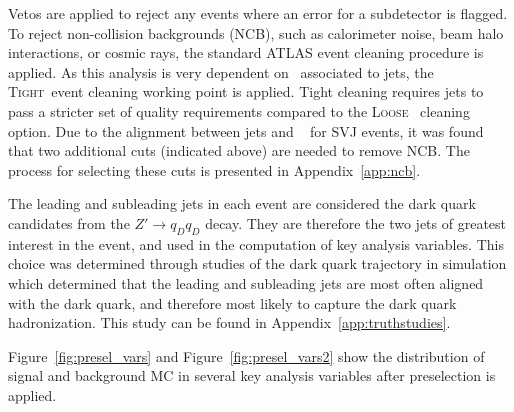 Vetos are applied to reject any events where an error for a subdetector is flagged. 
To reject non-collision backgrounds (NCB), such as calorimeter noise, beam halo interactions, or cosmic rays, the standard ATLAS event cleaning procedure is applied.
As this analysis is very dependent on \met~associated to jets, the \textsc{Tight}~\cite{tight_loose}event cleaning working point is applied. 
Tight cleaning requires jets to pass a stricter set of quality requirements compared to the \textsc{Loose}~\cite{tight_loose} cleaning option.
Due to the alignment between jets and \met~ for SVJ events, it was found that two additional cuts (indicated above) are needed to remove NCB.
The process for selecting these cuts is presented in Appendix~\ref{app:ncb}. 

The leading and subleading jets in each event are considered the dark quark candidates from the $Z' \rightarrow q_D q_D$ decay.  
They are therefore the two jets of greatest interest in the event, and used in the computation of key analysis variables.
This choice was determined through studies of the dark quark trajectory in simulation which determined that the leading and subleading jets are most often aligned with the dark quark, and therefore most likely to capture the dark quark hadronization.
This study can be found in Appendix~\ref{app:truthstudies}.

Figure~\ref{fig:presel_vars} and Figure~\ref{fig:presel_vars2} show the distribution of signal and background MC in several key analysis variables after preselection is applied.

